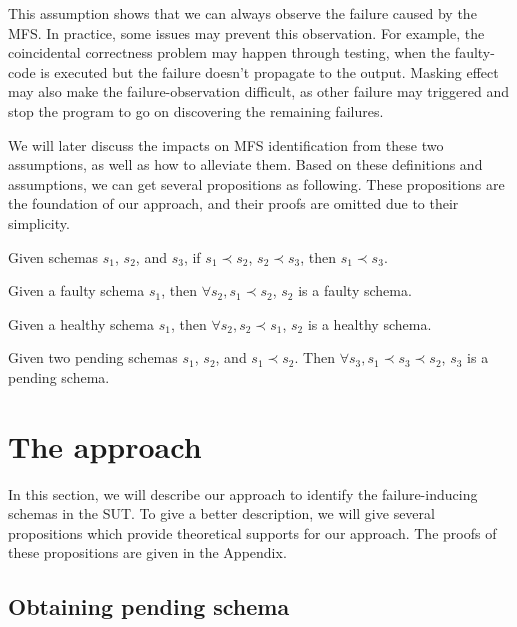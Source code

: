\documentclass{sig-alternate-05-2015}
\begin{document}
This assumption shows that we can always observe the failure caused by the MFS. In practice, some issues may prevent this observation. For example, the coincidental correctness problem \cite{Masri:2014:PCC:2582050.2559932} may happen through testing, when the faulty-code is executed but the failure doesn't propagate to the output. Masking effect \cite{yilmaz2013reducing} may also make the failure-observation difficult, as other failure may triggered and stop the program to go on discovering the remaining failures.

We will later discuss the impacts on MFS identification from these two assumptions, as well as how to alleviate them. Based on these definitions and assumptions, we can get several propositions as following. These propositions are the foundation of our approach, and their proofs are omitted due to their simplicity.

\begin{proposition}\label{pro:subsumetrans}
Given schemas $s_{1}$, $s_{2}$, and $s_{3}$, if $s_{1} \prec s_{2}$, $s_{2} \prec s_{3}$, then $s_{1} \prec s_{3}$.
\end{proposition}
\begin{proposition}\label{pro:superoffaulty}
Given a faulty schema $s_{1}$, then $\forall s_{2}, s_{1} \prec s_{2}$, $s_{2}$ is a faulty schema.
\end{proposition}
\begin{proposition}\label{pro:subofhealthy}
Given a healthy schema $s_{1}$, then $\forall s_{2}, s_{2} \prec s_{1}$, $s_{2}$ is a healthy schema.
\end{proposition}
\begin{proposition}\label{pro:pending}
Given two pending schemas $s_{1}$, $s_{2}$, and $s_{1} \prec s_{2}$. Then $\forall s_{3}, s_{1} \prec s_{3} \prec s_{2}$, $s_{3}$ is a pending schema.
\end{proposition}

\section{The approach}\label{sec:app}
In this section, we will describe our approach to identify the failure-inducing schemas in the SUT. To give a better description, we will give several propositions which provide theoretical supports for our approach. The proofs of these propositions are given in the Appendix.


\subsection{Obtaining pending schema}
\end{document}
